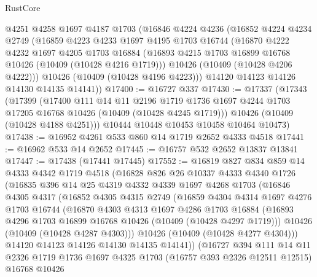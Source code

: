 \begin{lexlean}{RustCore}
\begin{coremodule}
    @4251
    @4258
    @1697
    @4187
    @1703
    (@16846
      @4224
      @4236
      (@16852
        @4224
        @4234
        @2749
        (@16859
          @4223
          @4233
          @1697
          @4195
          @1703
          @16744
          (@16870
            @4222
            @4232
            @1697
            @4205
            @1703
            @16884
            (@16893 @4215 @1703 @16899 @16768 @10426 (@10409 (@10428 @4216 @1719)))
            @10426
            (@10409 (@10428 @4206 @4222)))
          @10426
          (@10409 (@10428 @4196 @4223)))
        @14120
        @14123
        @14126
        @14130
        @14135
        @14141))
@17400 := @16727 @337
@17430 := @17337
    (@17343
      (@17399
        (@17400
          @111
          @14
          @11
          @2196
          @1719
          @1736
          @1697
          @4244
          @1703
          @17205
          @16768
          @10426
          (@10409 (@10428 @4245 @1719)))
        @10426
        (@10409 (@10428 @4188 @4251)))
      @10444
      @10448
      @10453
      @10458
      @10464
      @10473)
@17438 := @16952 @4261 @533 @860 @14 @1719 @2652 @4333 @4518
@17441 := @16962 @533 @14 @2652
@17445 := @16757 @532 @2652 @13837 @13841
@17447 := @17438 (@17441 @17445)
@17552 := @16819
    @827
    @834
    @859
    @14
    @4333
    @4342
    @1719
    @4518
    (@16828
      @826
      @26
      @10337
      @4333
      @4340
      @1726
      (@16835
        @396
        @14
        @25
        @4319
        @4332
        @4339
        @1697
        @4268
        @1703
        (@16846
          @4305
          @4317
          (@16852
            @4305
            @4315
            @2749
            (@16859
              @4304
              @4314
              @1697
              @4276
              @1703
              @16744
              (@16870
                @4303
                @4313
                @1697
                @4286
                @1703
                @16884
                (@16893 @4296 @1703 @16899 @16768 @10426 (@10409 (@10428 @4297 @1719)))
                @10426
                (@10409 (@10428 @4287 @4303)))
              @10426
              (@10409 (@10428 @4277 @4304)))
            @14120
            @14123
            @14126
            @14130
            @14135
            @14141))
        (@16727
          @394
          @111
          @14
          @11
          @2326
          @1719
          @1736
          @1697
          @4325
          @1703
          (@16757 @393 @2326 @12511 @12515)
          @16768
          @10426

\end{coremodule}
\end{lexlean}
